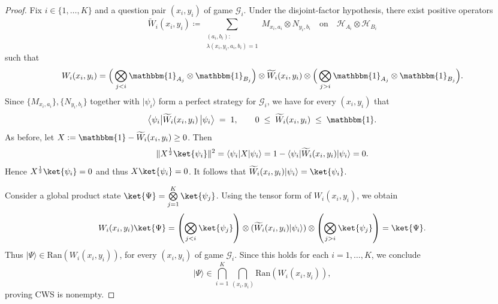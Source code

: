 \documentclass{article}
\begin{document}
    \begin{proof}
         Fix $i\in\{1,\dots,K\}$ and a question pair $(x_i,y_i)$ of game $\mathcal{G}_i$. Under the disjoint-factor hypothesis, there exist positive operators 
         \begin{equation}
             \widetilde{W}_i(x_i,y_i) \coloneqq \sum\limits_{\substack{(a_i,b_i): \\ \lambda(x_i,y_i,a_i,b_i)=1}} M_{x_i,a_i}\otimes N_{y_i,b_i} \quad\text{on}\quad \mathcal{H}_{A_i}\otimes\mathcal{H}_{B_i}
         \end{equation}
         such that 
         \begin{equation}
             W_i(x_i,y_i) = \Big(\bigotimes_{j<i} \mathbbm{1}_{A_j}\otimes \mathbbm{1}_{B_j}\Big)  \otimes  \widetilde{W}_i(x_i,y_i)  \otimes \Big(\bigotimes_{j>i} \mathbbm{1}_{A_j}\otimes \mathbbm{1}_{B_j}\Big).
         \end{equation}
         Since $\{M_{x_i,a_i}\},\{N_{y_i,b_i}\}$ together with $|\psi_i\rangle$ form a perfect strategy for $\mathcal{G}_i$, we have for every $(x_i,y_i)$ that 
         \begin{equation}
             \big\langle \psi_i\big| \widetilde{W}_i(x_i,y_i)\,\big|\psi_i\big\rangle \;=\; 1, \qquad 0 \;\le\; \widetilde{W}_i(x_i,y_i) \;\le\; \mathbbm{1}.
         \end{equation}
         As before, let $X:=\mathbbm{1}-\widetilde{W}_i(x_i,y_i)\ge 0$. Then
         \begin{equation}
             \|X^{\frac{1}{2}}\ket{\psi_i}\|^2 = \langle\psi_i|X|\psi_i\rangle = 1- \langle\psi_i|\widetilde{W}_i(x_i,y_i)|\psi_i\rangle = 0. 
         \end{equation}
         Hence $X^{\frac{1}{2}}\ket{\psi_i}=0$ and thus $X\ket{\psi_i}=0$. It follows that $\widetilde{W}_i(x_i,y_i)|\psi_i\rangle =\ket{\psi_i}$. 

         Consider a global product state $\ket{\Psi}=\bigotimes\limits_{j=1}^K\ket{\psi_j}$. Using the tensor form of $W_i(x_i,y_i)$, we obtain
         \begin{equation}
             W_i(x_i,y_i)\ket{\Psi} = \left(\bigotimes\limits_{j<i}\ket{\psi_j} \right) \otimes (\widetilde{W}_i(x_i,y_i)|\psi_i\rangle) \otimes \left(\bigotimes\limits_{j>i}\ket{\psi_j} \right) =\ket{\Psi}.
         \end{equation}
         Thus $|\Psi\rangle\in \mathrm{Ran}(W_i(x_i,y_i))$, for every $(x_i,y_i)$ of game $\mathcal{G}_i$. Since this holds for each $i=1,\dots,K$, we conclude
         \begin{equation}
             |\Psi\rangle \in \bigcap_{i=1}^K \bigcap_{(x_i,y_i)} \mathrm{Ran}(W_i(x_i,y_i)),
         \end{equation}
         proving CWS is nonempty. 
    \end{proof}
\end{document}
